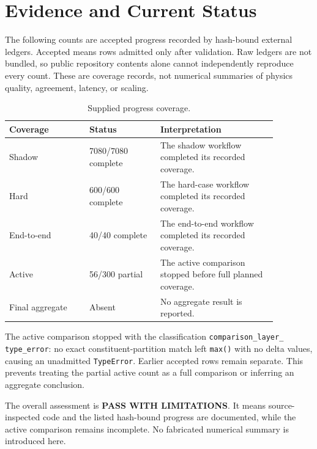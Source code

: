 \section{Evidence and Current Status}
The following counts are accepted progress recorded by hash-bound external ledgers. Accepted means rows admitted only after validation. Raw ledgers are not bundled, so public repository contents alone cannot independently reproduce every count. These are coverage records, not numerical summaries of physics quality, agreement, latency, or scaling.

\begin{table}[htbp]\centering\small
\caption{Supplied progress coverage.}\begin{tabular}{L{0.26\linewidth}L{0.23\linewidth}L{0.38\linewidth}}\toprule
Coverage & Status & Interpretation\\\midrule
Shadow & 7080/7080 complete & The shadow workflow completed its recorded coverage.\\
Hard & 600/600 complete & The hard-case workflow completed its recorded coverage.\\
End-to-end & 40/40 complete & The end-to-end workflow completed its recorded coverage.\\
Active & 56/300 partial & The active comparison stopped before full planned coverage.\\
Final aggregate & Absent & No aggregate result is reported.\\\bottomrule
\end{tabular}\end{table}

\partialevidence The active comparison stopped with the classification \texttt{comparison\_layer\_}\\\texttt{type\_error}: no exact constituent-partition match left \texttt{max()} with no delta values, causing an unadmitted \texttt{TypeError}. Earlier accepted rows remain separate. This prevents treating the partial active count as a full comparison or inferring an aggregate conclusion.

\measured The overall assessment is \textbf{PASS WITH LIMITATIONS}. It means source-inspected code and the listed hash-bound progress are documented, while the active comparison remains incomplete. No fabricated numerical summary is introduced here.

\clearpage
